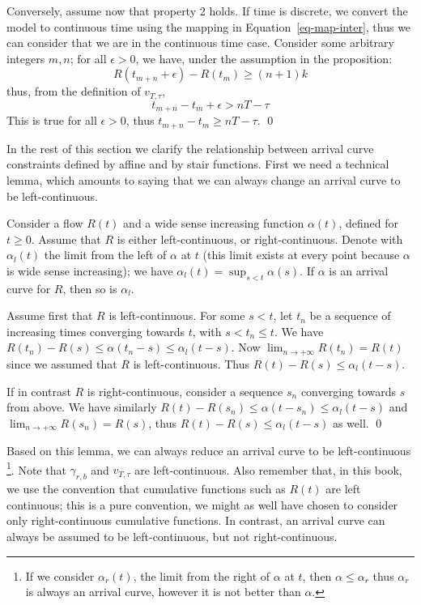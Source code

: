 Conversely, assume now that property 2 holds. If time is discrete,
we convert the model to continuous time using the mapping in
Equation~\ref{eq-map-inter}, thus we can consider that we are in
the continuous time case. Consider some arbitrary integers $m, n$;
for all $\epsilon >0$, we have, under the assumption in the
proposition: $$ R(t_{m+n}+\epsilon)- R(t_{m}) \geq (n+1)k $$ thus,
from the definition of $v_{T, \tau}$, $$ t_{m+n} - t_{m} +\epsilon
> nT -\tau $$ This is true for all  $\epsilon >0$, thus $t_{m+n} -
t_{m} \geq  nT -\tau$. \qed

In the rest of this section we clarify the relationship between
arrival curve constraints defined by affine and by stair
functions. First we need a technical lemma, which amounts to
saying that we can always change an arrival curve to be
left-continuous.
\begin{lemma}
 Consider a flow $R(t)$ and a wide sense
increasing function $\alpha(t)$, defined for $t\geq 0$. Assume
that $R$ is either left-continuous, or right-continuous. Denote
with $\alpha_l(t)$ the limit from the left%
 of $\alpha$ at $t$ (this limit exists at
every point because $\alpha$ is wide sense increasing); we have
$\alpha_l(t)=\sup_{s<t}\alpha(s)$. If $\alpha$ is an arrival curve
for $R$, then so is $ \alpha_l$.
\end{lemma}
\pr Assume first that $R$ is left-continuous. For some $s < t$,
let $t_{n}$ be a sequence of increasing times converging towards
$t$, with $s < t_{n} \leq t$.  We have $R(t_{n})- R(s) \leq
\alpha(t_{n}-s) \leq \alpha_l(t-s)$.  Now $\lim_{n \rightarrow
+\infty} R(t_{n})=R(t)$ since we assumed that $R$ is
left-continuous.  Thus $R(t)-R(s) \leq \alpha_l(t-s)$.

If in contrast $R$ is right-continuous, consider a sequence
$s_{n}$ converging towards $s$ from above. We have similarly
$R(t)- R(s_{n}) \leq \alpha(t-s_{n}) \leq \alpha_l(t-s)$ and
$\lim_{n \rightarrow +\infty} R(s_{n})=R(s)$, thus $R(t)-R(s) \leq
\alpha_l(t-s)$ as well. \qed

Based on this lemma, we can always reduce an arrival curve to be
left-continuous%
\footnote{If we consider $\alpha_r(t)$, the limit from the right of
$\alpha$ at $t$, then $\alpha \leq \alpha_r$ thus $\alpha_r$ is
always an arrival curve, however it is not better than $\alpha$.}.
Note that $\gamma_{r,b}$ and $v_{T, \tau}$ are left-continuous.
Also remember that, in this book, we use the convention that
cumulative functions such as $R(t)$ are left continuous; this is a
pure convention, we might as well have chosen to consider only
right-continuous cumulative functions. In contrast, an arrival
curve can always be assumed to be left-continuous, but not
right-continuous.


